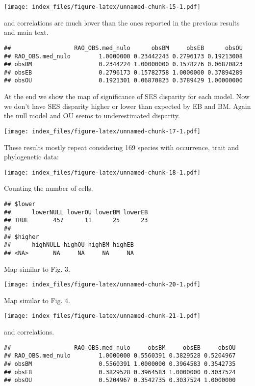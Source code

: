 \documentclass[
]{article}
\begin{document}
\texttt{[image: index\_files/figure-latex/unnamed-chunk-15-1.pdf]}

and correlations are much lower than the ones reported in the previous
results and main text.

\begin{verbatim}
##                  RAO_OBS.med_nulo      obsBM     obsEB      obsOU
## RAO_OBS.med_nulo        1.0000000 0.23442243 0.2796173 0.19213008
## obsBM                   0.2344224 1.00000000 0.1578276 0.06870823
## obsEB                   0.2796173 0.15782758 1.0000000 0.37894289
## obsOU                   0.1921301 0.06870823 0.3789429 1.00000000
\end{verbatim}

At the end we show the map of significance of SES disparity for each
model. Now we don't have SES disparity higher or lower than expected by
EB and BM. Again the null model and OU seems to underestimated
disparity.

\texttt{[image: index\_files/figure-latex/unnamed-chunk-17-1.pdf]}

These results mostly repeat considering 169 species with occurrence,
trait and phylogenetic data:

\texttt{[image: index\_files/figure-latex/unnamed-chunk-18-1.pdf]}

Counting the number of cells.

\begin{verbatim}
## $lower
##      lowerNULL lowerOU lowerBM lowerEB
## TRUE       457      11      25      23
## 
## $higher
##      highNULL highOU highBM highEB
## <NA>       NA     NA     NA     NA
\end{verbatim}

Map similar to Fig. 3.

\texttt{[image: index\_files/figure-latex/unnamed-chunk-20-1.pdf]}

Map similar to Fig. 4.

\texttt{[image: index\_files/figure-latex/unnamed-chunk-21-1.pdf]}

and correlations.

\begin{verbatim}
##                  RAO_OBS.med_nulo     obsBM     obsEB     obsOU
## RAO_OBS.med_nulo        1.0000000 0.5560391 0.3829528 0.5204967
## obsBM                   0.5560391 1.0000000 0.3964583 0.3542735
## obsEB                   0.3829528 0.3964583 1.0000000 0.3037524
## obsOU                   0.5204967 0.3542735 0.3037524 1.0000000
\end{verbatim}
\end{document}
